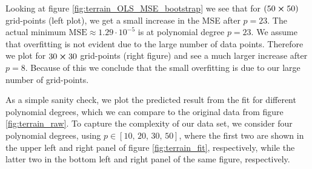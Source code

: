 \documentclass[reprint,english,notitlepage,aps,nobalancelastpage,nofootinbib]{revtex4-1}  %
\begin{document}
Looking at figure \ref{fig:terrain_OLS_MSE_bootstrap} we see that for $(50\cross50)$ grid-points (left plot), we get a small increase in the MSE after $p = 23$. The actual minimum $\text{MSE} \approx 1.29\cdot10^{-5}$ is at polynomial degree $p = 23$. We assume that overfitting is not evident due to the large number of data points. Therefore we plot for $30\cross30$ grid-points (right figure) and see a much larger increase after $p = 8$. Because of this we conclude that the small overfitting is due to our large number of grid-points.

As a simple sanity check, we plot the predicted result from the fit for different polynomial degrees, which we can compare to the original data from figure \ref{fig:terrain_raw}. To capture the complexity of our data set, we consider four polynomial degrees, using $p\in[10,\,20,\,30,\,50]$, where the first two are shown in the upper left and right panel of figure \ref{fig:terrain_fit}, respectively, while the latter two in the bottom left and right panel of the same figure, respectively.
\end{document}
